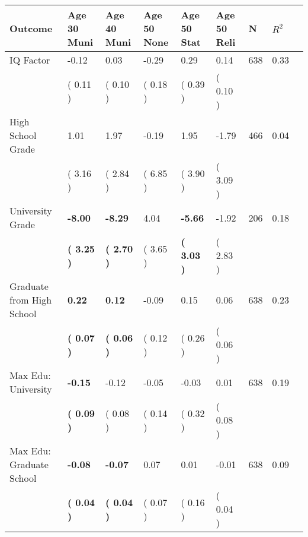 \begin{tabular}{L{6.2cm} C{1.8cm} C{1.8cm} C{1.8cm} C{1.8cm} C{1.8cm} C{1.8cm} C{0.3cm} C{0.3cm}}
\toprule
 \textbf{Outcome} & \textbf{Age 30 Muni} & \textbf{Age 40 Muni} & \textbf{Age 50 None} & \textbf{Age 50 Stat} & \textbf{Age 50 Reli} & \textbf{N} & \textbf{$ R^2$} \\
\midrule
IQ Factor &     -0.12 &      0.03 &     -0.29 &      0.29 &      0.14  & 638 &       0.33 \\ 
 & (     0.11 ) & (     0.10 ) & (     0.18 ) & (     0.39 ) & (     0.10 )  & \\
High School Grade &      1.01 &      1.97 &     -0.19 &      1.95 &     -1.79  & 466 &       0.04 \\ 
 & (     3.16 ) & (     2.84 ) & (     6.85 ) & (     3.90 ) & (     3.09 )  & \\
University Grade & \textbf{    -8.00} & \textbf{    -8.29} &      4.04 & \textbf{    -5.66} &     -1.92  & 206 &       0.18 \\ 
 & \textbf{(     3.25 )} & \textbf{(     2.70 )} & (     3.65 ) & \textbf{(     3.03 )} & (     2.83 )  & \\
Graduate from High School & \textbf{     0.22} & \textbf{     0.12} &     -0.09 &      0.15 &      0.06  & 638 &       0.23 \\ 
 & \textbf{(     0.07 )} & \textbf{(     0.06 )} & (     0.12 ) & (     0.26 ) & (     0.06 )  & \\
Max Edu: University & \textbf{    -0.15} &     -0.12 &     -0.05 &     -0.03 &      0.01  & 638 &       0.19 \\ 
 & \textbf{(     0.09 )} & (     0.08 ) & (     0.14 ) & (     0.32 ) & (     0.08 )  & \\
Max Edu: Graduate School & \textbf{    -0.08} & \textbf{    -0.07} &      0.07 &      0.01 &     -0.01  & 638 &       0.09 \\ 
 & \textbf{(     0.04 )} & \textbf{(     0.04 )} & (     0.07 ) & (     0.16 ) & (     0.04 )  & \\
\bottomrule
\end{tabular}
